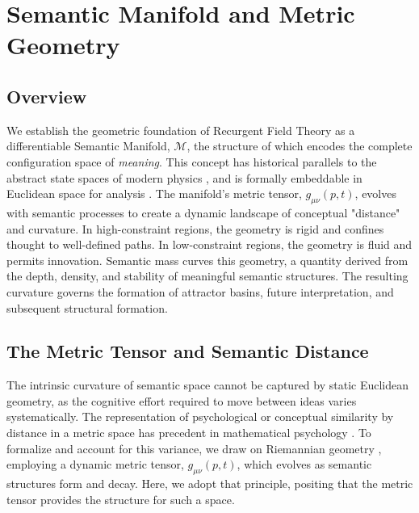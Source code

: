 \chapter{Semantic Manifold and Metric Geometry}
\label{3:semantic_manifold_and_metric_geometry}


\section{Overview}
\label{3.1:overview}

We establish the geometric foundation of Recurgent Field Theory as a differentiable Semantic Manifold, \(\mathcal{M}\), the structure of which encodes the complete configuration space of \textit{meaning}. This concept has historical parallels to the abstract state spaces of modern physics \autocite{vonNeumann1932}, and is formally embeddable in Euclidean space for analysis \autocite{Whitney1936}. The manifold's metric tensor, \(g_{\mu\nu}(p, t)\), evolves with semantic processes to create a dynamic landscape of conceptual "distance" and curvature. In high-constraint regions, the geometry is rigid and confines thought to well-defined paths. In low-constraint regions, the geometry is fluid and permits innovation. Semantic mass curves this geometry, a quantity derived from the depth, density, and stability of meaningful semantic structures. The resulting curvature governs the formation of attractor basins, future interpretation, and subsequent structural formation.


\section{The Metric Tensor and Semantic Distance}
\label{3.2:the_metric_tensor_and_semantic_distance}

The intrinsic curvature of semantic space cannot be captured by static Euclidean geometry, as the cognitive effort required to move between ideas varies systematically. The representation of psychological or conceptual similarity by distance in a metric space has precedent in mathematical psychology \autocite{Shepard1987}. To formalize and account for this variance, we draw on Riemannian geometry \autocite{Riemann1868, doCarmo1992}, employing a dynamic metric tensor, \(g_{\mu\nu}(p,t)\), which evolves as semantic structures form and decay. Here, we adopt that principle, positing that the metric tensor provides the structure for such a space.

